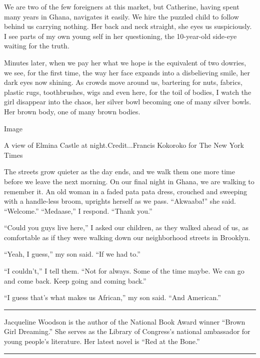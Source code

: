 We are two of the few foreigners at this market, but Catherine, having
spent many years in Ghana, navigates it easily. We hire the puzzled
child to follow behind us carrying nothing. Her back and neck straight,
she eyes us suspiciously. I see parts of my own young self in her
questioning, the 10-year-old side-eye waiting for the truth.

Minutes later, when we pay her what we hope is the equivalent of two
dowries, we see, for the first time, the way her face expands into a
disbelieving smile, her dark eyes now shining. As crowds move around us,
bartering for nuts, fabrics, plastic rugs, toothbrushes, wigs and even
here, for the toil of bodies, I watch the girl disappear into the chaos,
her silver bowl becoming one of many silver bowls. Her brown body, one
of many brown bodies.

Image

A view of Elmina Castle at night.Credit...Francis Kokoroko for The New
York Times

The streets grow quieter as the day ends, and we walk them one more time
before we leave the next morning. On our final night in Ghana, we are
walking to remember it. An old woman in a faded pata pata dress,
crouched and sweeping with a handle-less broom, uprights herself as we
pass. ``Akwaaba!'' she said. ``Welcome.'' ``Medaase,'' I respond.
``Thank you.''

``Could you guys live here,'' I asked our children, as they walked ahead
of us, as comfortable as if they were walking down our neighborhood
streets in Brooklyn.

``Yeah, I guess,'' my son said. ``If we had to.''

``I couldn't,'' I tell them. ``Not for always. Some of the time maybe.
We can go and come back. Keep going and coming back.''

``I guess that's what makes us African,'' my son said. ``And American.''

\begin{center}\rule{0.5\linewidth}{\linethickness}\end{center}

Jacqueline Woodson is the author of the National Book Award winner
``Brown Girl Dreaming.'' She serves as the Library of Congress's
national ambassador for young people's literature. Her latest novel is
``Red at the Bone.''

\begin{center}\rule{0.5\linewidth}{\linethickness}\end{center}

